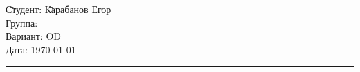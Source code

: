 \begin{tabbing}
	\hspace{11cm} \= Студент: \= Карабанов Егор \\ %
	\> Группа:  \\  %
	\> Вариант: \> OD \\    %
	\> Дата: \> \today     %
\end{tabbing}
\hrule
\vspace{1cm}